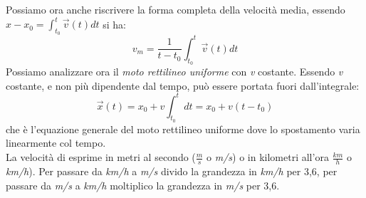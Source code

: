 \documentclass[a4paper,12pt, oneside]{book}
\begin{document}
Possiamo ora anche riscrivere la forma completa della velocità media, essendo $x-x_0=\int_{t_0}^t \vec{v}(t) dt$ si ha:
$$v_m=\frac{1}{t-t_0}\int_{t_0}^t \vec{v}(t) dt$$
Possiamo analizzare ora il \textit{moto rettilineo uniforme} con \textit{v} costante. Essendo \textit{v} costante, e non più dipendente dal tempo, può essere portata fuori dall'integrale:
$$\vec{x}(t)=x_0+v\int_{t_0}^t dt=x_0+v(t-t_0)$$
che è l'equazione generale del moto rettilineo uniforme dove lo spostamento varia linearmente col tempo.\\
La velocità di esprime in metri al secondo ($\frac{m}{s}$ o \textit{m/s}) o in kilometri all'ora $\frac{km}{h}$ o \textit{km/h}). Per passare da \textit{km/h} a \textit{m/s} divido la grandezza in \textit{km/h} per 3,6, per passare da \textit{m/s} a \textit{km/h} moltiplico la grandezza in \textit{m/s} per 3,6. 
\end{document}

